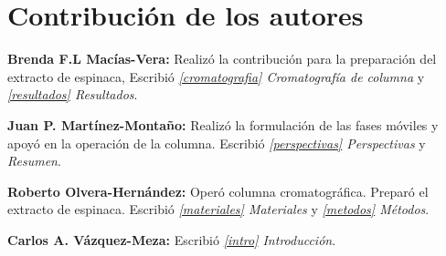 \documentclass{ITESO-Project}
\begin{document}
\section{Contribución de los autores}
{\color{darkgray}\bfseries Brenda F.L Macías-Vera:}\hspace{1em}
Realizó la contribución para la preparación del extracto de espinaca, Escribió \textit{\ref{cromatografia} Cromatografía de columna} y \textit{\ref{resultados} Resultados}.

{\color{darkgray}\bfseries Juan P. Martínez-Montaño:}\hspace{1em}
Realizó la formulación de las fases móviles y apoyó en la operación de la columna. Escribió \textit{\ref{perspectivas} Perspectivas} y \textit{Resumen}.

{\color{darkgray}\bfseries Roberto Olvera-Hernández:}\hspace{1em}
Operó columna cromatográfica. Preparó el extracto de espinaca. Escribió \textit{\ref{materiales} Materiales} y \textit{\ref{metodos} Métodos}.

{\color{darkgray}\bfseries Carlos A. Vázquez-Meza:}\hspace{1em}
Escribió \textit{\ref{intro} Introducción}.

\printbibliography[title=Referencias citadas]
\end{document}
